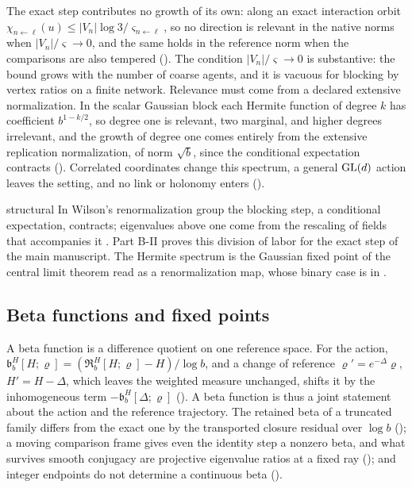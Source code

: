The exact step contributes no growth of its own: along an exact interaction orbit
\(\chi_{n\leftarrow\ell}(u)\leq\lvert V_n\rvert\log3/\varsigma_{n\leftarrow\ell}\), so no direction is
relevant in the native norms when \(\lvert V_n\rvert/\varsigma\to0\), and the same holds in the reference norm
when the comparisons are also tempered (). The condition
\(\lvert V_n\rvert/\varsigma\to0\) is substantive: the bound grows with the number of coarse agents, and it
is vacuous for blocking by vertex ratios on a finite network. Relevance must come from a declared extensive normalization.
In the scalar Gaussian block each Hermite function of degree \(k\) has coefficient \(b^{1-k/2}\), so degree
one is relevant, two marginal, and higher degrees irrelevant, and the growth of degree one comes entirely
from the extensive replication normalization, of norm \(\sqrt b\), since the conditional expectation
contracts (). Correlated coordinates
change this spectrum, a general \(\mathrm{GL}(d)\) action leaves the setting, and no link or holonomy enters
().

\begin{analogy}{structural}
In Wilson's renormalization group the blocking step, a conditional expectation, contracts; eigenvalues
above one come from the rescaling of fields that accompanies it \citep{wilson1974renormalization}. Part
B-II proves this division of labor for the exact step of the main manuscript. The Hermite spectrum is the
Gaussian fixed point of the central limit theorem read as a renormalization map, whose binary case is in
\citet{JonaLasinio2001}.
\end{analogy}

\subsection{Beta functions and fixed points}
\label{comp:sb-beta}

A beta function is a difference quotient on one reference space. For the action,
\(\mathfrak b^H_b[H;\varrho]=(\mathfrak R^H_b[H;\varrho]-H)/\log b\), and a change of reference
\(\varrho'=e^{-\Delta}\varrho\), \(H'=H-\Delta\), which leaves the weighted measure unchanged, shifts it by
the inhomogeneous term \(-\mathfrak b^H_b[\Delta;\varrho]\) (). A
beta function is thus a joint statement about the action and the reference trajectory. The retained beta
of a truncated family differs from the exact one by the transported closure residual over \(\log b\)
(); a moving comparison frame gives even the identity step a nonzero
beta, and what survives smooth conjugacy are projective eigenvalue ratios at a fixed ray
(); and integer endpoints do not determine a continuous beta
().

